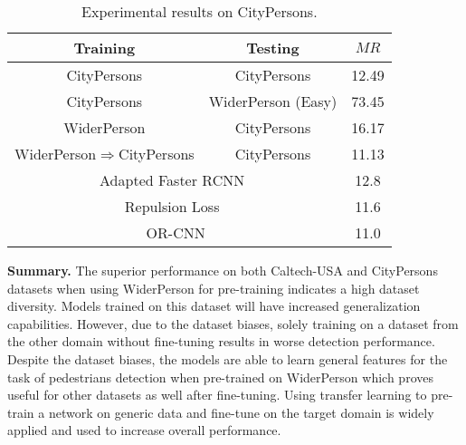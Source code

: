 \documentclass[journal]{IEEEtran}
\begin{document}
\begin{table}[t]
\begin{center}
\caption{Experimental results on CityPersons.}
\label{tab:citypersons}
\setlength{\tabcolsep}{12.5pt}
\begin{tabular}{ccc}
\toprule[2pt]
{Training} & {Testing} & $MR$ \\
\hline
CityPersons & CityPersons & {12.49}\\
CityPersons & WiderPerson (Easy) & {73.45}\\
WiderPerson & CityPersons & {16.17}\\
WiderPerson$\Rightarrow$CityPersons & CityPersons & 11.13\\
\hline
\hline
\multicolumn{2}{c}{Adapted Faster RCNN~\cite{DBLP:conf/cvpr/ZhangBS17}} &12.8\\
\multicolumn{2}{c}{Repulsion Loss~\cite{DBLP:journals/corr/abs-1711-07752}} &11.6\\
\multicolumn{2}{c}{OR-CNN\cite{zhang2018occlusion}} &11.0\\
\bottomrule[2pt]
\end{tabular}
\end{center}
\end{table}

{\flushleft \textbf{Summary. }}
The superior performance on both Caltech-USA and CityPersons datasets when using WiderPerson for pre-training indicates a high dataset diversity. Models trained on this dataset will have increased generalization capabilities. However, due to the dataset biases, solely training on a dataset from the other domain without fine-tuning results in worse detection performance. Despite the dataset biases, the models are able to learn general features for the task of pedestrians detection when pre-trained on WiderPerson which proves useful for other datasets as well after fine-tuning. Using transfer learning to pre-train a network on generic data and fine-tune on the target domain is widely applied and used to increase overall performance. 
\end{document}
